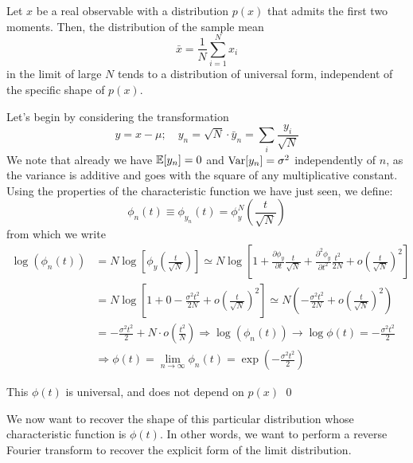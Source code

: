 \begin{theorem}\label{th:central_limit}
	Let $x$ be a real observable with a distribution $p(x)$ that admits the first two moments. 
	Then, the distribution of the sample mean 
	\[
	\bar{x} = \frac{1}{N} \sum_{i=1}^{N} x_i
	\]
	in the limit of large $N$ tends to a distribution of universal form, independent of the specific shape of $p(x)$.
\end{theorem}

\begin{example}
	Let's begin by considering the transformation
	\[
	y = x-\mu; \quad y_n = \sqrt{N}\cdot\bar{y}_n = \sum_i\frac{y_i}{\sqrt{N}}
	\]
	We note that already we have $\mathbb{E}[y_n]=0$ and $\operatorname{Var}[y_n]=\sigma^2$ independently of $n$, as the variance is additive and goes with the square of any multiplicative constant. Using the properties of the characteristic function we have just seen, we define:
	\[
	\phi_n(t)\equiv \phi_{y_n}(t) = \phi_y^N\left(\frac{t}{\sqrt{N}} \right)
	\]
	from which we write
	\begin{align*}
		\log\left(\phi_n(t)\right) &= N\log\left[ \phi_y \left(\frac{t}{\sqrt{N}}\right) \right] \simeq N\log\left[ 1 + \frac{\partial\phi_y}{\partial t}\frac{t}{\sqrt{N}} + \frac{\partial^2\phi_y}{\partial t^2}\frac{t^2}{2N} + o\left(\frac{t}{\sqrt{N}}\right)^2\right]\\
		&=N\log\left[1+0-\frac{\sigma^2t^2}{2N}+ o\left(\frac{t}{\sqrt{N}}\right)^2\right]\simeq N \left(-\frac{\sigma^2t^2}{2N}+ o\left(\frac{t}{\sqrt{N}}\right)^2\right)\\
		&=-\frac{\sigma^2t^2}{2}+ N\cdot o\left(\frac{t^2}{N}\right)\Rightarrow\log\left(\phi_n(t)\right)\rightarrow\log\phi(t)=-\frac{\sigma^2t^2}{2}\\
		&\Rightarrow \phi(t) = \lim_{n\to\infty}\phi_n(t)=\exp\left(-\frac{\sigma^2t^2}{2}\right)
	\end{align*}
	
	This $\phi(t)$ is universal, and does not depend on $p(x)$ \qed
	
\end{example}

We now want to recover the shape of this particular distribution whose characteristic function is $\phi(t)$. In other words, we want to perform a reverse Fourier transform to recover the explicit form of the limit distribution.
 
